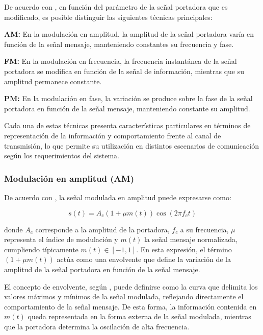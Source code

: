 De acuerdo con \cite{haykin2001}, en función del parámetro de la señal portadora que es modificado, es posible distinguir las siguientes técnicas principales:

\textbf{AM:} En la modulación en amplitud, la amplitud de la señal portadora varía en función de la señal mensaje, manteniendo constantes su frecuencia y fase.

\textbf{FM:} En la modulación en frecuencia, la frecuencia instantánea de la señal portadora se modifica en función de la señal de información, mientras que su amplitud permanece constante.

\textbf{PM:} En la modulación en fase, la variación se produce sobre la fase de la señal portadora en función de la señal mensaje, manteniendo constante su amplitud.

Cada una de estas técnicas presenta características particulares en términos de representación de la información y comportamiento frente al canal de transmisión, lo que permite su utilización en distintos escenarios de comunicación según los requerimientos del sistema.



\subsubsection{Modulación en amplitud (AM)}

De acuerdo con \cite{proakis2007digital}, la señal modulada en amplitud puede expresarse como:

\begin{equation}
s(t) = A_c \left(1 + \mu m(t)\right) \cos(2\pi f_c t)
\label{eq:am}
\end{equation}

donde $A_c$ corresponde a la amplitud de la portadora, $f_c$ a su frecuencia, $\mu$ representa el índice de modulación y $m(t)$ la señal mensaje normalizada, cumpliendo típicamente $m(t) \in [-1,1]$. En esta expresión, el término $(1 + \mu m(t))$ actúa como una envolvente que define la variación de la amplitud de la señal portadora en función de la señal mensaje.

El concepto de envolvente, según \cite{haykin2001}, puede definirse como la curva que delimita los valores máximos y mínimos de la señal modulada, reflejando directamente el comportamiento de la señal mensaje. De esta forma, la información contenida en $m(t)$ queda representada en la forma externa de la señal modulada, mientras que la portadora determina la oscilación de alta frecuencia.

